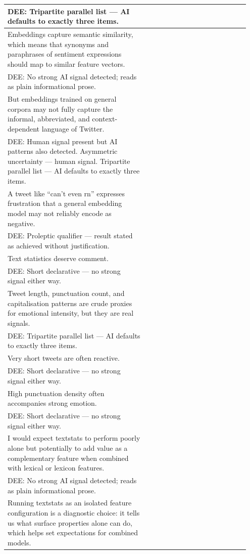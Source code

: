 \documentclass[11pt]{article}
\begin{document}
\begin{longtable}{|p{0.55\linewidth}|p{0.40\linewidth}|}
\hline
DEE: Tripartite parallel list --- AI defaults to exactly three items. & \\
\hline
Embeddings capture semantic similarity, which means that synonyms and paraphrases of sentiment expressions should map to similar feature vectors. & \\[2pt]
\hline
DEE: No strong AI signal detected; reads as plain informational prose. & \\
\hline
But embeddings trained on general corpora may not fully capture the informal, abbreviated, and context-dependent language of Twitter. & \\[2pt]
\hline
DEE: Human signal present but AI patterns also detected. Asymmetric uncertainty --- human signal. Tripartite parallel list --- AI defaults to exactly three items. & \\
\hline
A tweet like ``can't even rn'' expresses frustration that a general embedding model may not reliably encode as negative. & \\[2pt]
\hline
DEE: Proleptic qualifier --- result stated as achieved without justification. & \\
\hline
Text statistics deserve comment. & \\[2pt]
\hline
DEE: Short declarative --- no strong signal either way. & \\
\hline
Tweet length, punctuation count, and capitalisation patterns are crude proxies for emotional intensity, but they are real signals. & \\[2pt]
\hline
DEE: Tripartite parallel list --- AI defaults to exactly three items. & \\
\hline
Very short tweets are often reactive. & \\[2pt]
\hline
DEE: Short declarative --- no strong signal either way. & \\
\hline
High punctuation density often accompanies strong emotion. & \\[2pt]
\hline
DEE: Short declarative --- no strong signal either way. & \\
\hline
I would expect textstats to perform poorly alone but potentially to add value as a complementary feature when combined with lexical or lexicon features. & \\[2pt]
\hline
DEE: No strong AI signal detected; reads as plain informational prose. & \\
\hline
Running textstats as an isolated feature configuration is a diagnostic choice: it tells us what surface properties alone can do, which helps set expectations for combined models. & \\[2pt]

\end{longtable}
\end{document}
